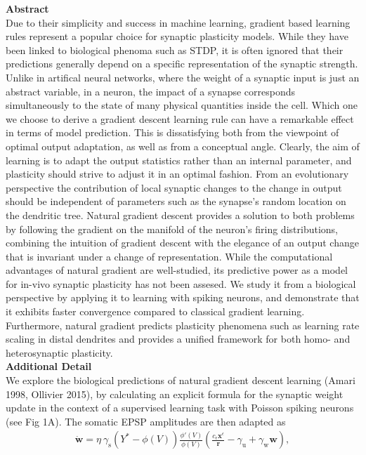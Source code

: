 \documentclass[12pt]{article}
\newcommand{\lb}{\left}
\newcommand{\mb}{\mathbf}
\newcommand{\mrm}{\mathrm}
\newcommand{\rb}{\right}
\newcommand{\xeps}{\mathbf x^{\epsilon}}
\begin{document}
\setlength{\abovedisplayskip}{3pt}
\setlength{\belowdisplayskip}{3pt}
{\bf Abstract}\\
Due to their simplicity and success in machine learning, gradient based learning rules represent a popular choice for synaptic plasticity models. While they have been linked to biological phenoma such as STDP, it is often ignored that their predictions generally depend on a specific representation of the synaptic strength. Unlike in artifical neural networks, where the weight of a synaptic input is just an abstract variable, in a neuron, the impact of a synapse corresponds simultaneously to the state of many physical quantities inside the cell. Which one we choose to derive a gradient descent learning rule can have a remarkable effect in terms of model prediction. This is dissatisfying both from the viewpoint of optimal output adaptation, as well as from a conceptual angle. Clearly, the aim of learning is to adapt the output statistics rather than an internal parameter, and plasticity should strive to adjust it in an optimal fashion. From an evolutionary perspective the contribution of local synaptic changes to the change in output should be independent of parameters such as the synapse's random location on the dendritic tree. Natural gradient descent provides a solution to both problems by following the gradient on the manifold of the neuron's firing distributions, combining the intuition of gradient descent with the elegance of an output change that is invariant under a change of representation. While the computational advantages of natural gradient are well-studied, its predictive power as a model for in-vivo synaptic plasticity has not been assesed. We study it from a biological perspective by applying it to learning with spiking neurons,  and demonstrate that it exhibits faster convergence compared to classical gradient learning. Furthermore, natural gradient predicts plasticity phenomena such as learning rate scaling in distal dendrites and provides a unified framework for both homo- and heterosynaptic plasticity.\\
{ \bf Additional Detail}\\
We explore the biological predictions of natural gradient descent learning (Amari 1998, Ollivier 2015), by calculating an explicit formula for the synaptic weight update in the context of a supervised learning task with Poisson spiking neurons (see Fig 1A). The somatic EPSP amplitudes are then adapted as 
\begin{eqnarray}
\label{Results_Natural_Gradient}
\dot{\mb w} =\eta \ \gamma_{\mrm s} \lb(Y^*-\phi(V)\rb) \frac{\phi'(V)}{\phi(V)}\lb(\frac{c_{\epsilon}\xeps}{\mb r}-\gamma_{\mrm u}+\gamma_{\mrm w}{\mb w}\rb),
\end{eqnarray} 
\end{document}
